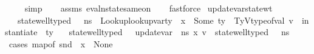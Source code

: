 \begin{isabellebody}
\ \ \ \isamarkupfalse%
\ simp\isanewline
\ \ \isamarkupfalse%
\ assms{\isacharparenleft}{\kern0pt}{}{\isacharparenright}{\kern0pt}\ eval{\isacharunderscore}{\kern0pt}nstate{\isacharunderscore}{\kern0pt}same{\isacharunderscore}{\kern0pt}on{\isacharparenleft}{\kern0pt}{}{\isacharparenright}{\kern0pt}\isanewline
\ \ \isamarkupfalse%
\ fastforce%
\endisatagproof
{\isafoldproof}%
%
\isadelimproof
\isanewline
%
\endisadelimproof
\isanewline
{}\isamarkupfalse%
%
\isadelimdocument
%
\endisadelimdocument
%
\isatagdocument
%
\isamarkuptrue%
%
\endisatagdocument
{\isafolddocument}%
%
\isadelimdocument
%
\endisadelimdocument
{}\isamarkupfalse%
\ update{\isacharunderscore}{\kern0pt}var{\isacharunderscore}{\kern0pt}state{\isacharunderscore}{\kern0pt}wt{\isacharcolon}{\kern0pt}\isanewline
\ \ \ {\isachardoublequoteopen}state{\isacharunderscore}{\kern0pt}well{\isacharunderscore}{\kern0pt}typed\ {\isasymLambda}\ {\isasymOmega}\ ns{\isachardoublequoteclose}\ \ Lookup{\isacharcolon}{\kern0pt}{\isachardoublequoteopen}lookup{\isacharunderscore}{\kern0pt}var{\isacharunderscore}{\kern0pt}ty\ {\isasymLambda}\ x\ {\isacharequal}{\kern0pt}\ Some\ ty{\isachardoublequoteclose}\ \ TyV{\isacharcolon}{\kern0pt}{\isachardoublequoteopen}type{\isacharunderscore}{\kern0pt}of{\isacharunderscore}{\kern0pt}val\ v\ {\isacharequal}{\kern0pt}\ instantiate\ {\isasymOmega}\ ty{\isachardoublequoteclose}\isanewline
\ \ \ {\isachardoublequoteopen}state{\isacharunderscore}{\kern0pt}well{\isacharunderscore}{\kern0pt}typed\ {\isasymLambda}\ {\isasymOmega}\ {\isacharparenleft}{\kern0pt}update{\isacharunderscore}{\kern0pt}var\ {\isasymLambda}\ ns\ x\ v{\isacharparenright}{\kern0pt}{\isachardoublequoteclose}\ {\isacharparenleft}{\kern0pt}\ {\isachardoublequoteopen}state{\isacharunderscore}{\kern0pt}well{\isacharunderscore}{\kern0pt}typed\ {\isasymLambda}\ {\isasymOmega}\ {\isacharquery}{\kern0pt}ns{\isacharprime}{\kern0pt}{\isachardoublequoteclose}{\isacharparenright}{\kern0pt}\isanewline
%
\isadelimproof
\ \ %
\endisadelimproof
%
\isatagproof
{}\isamarkupfalse%
\ {\isacharparenleft}{\kern0pt}cases\ {\isachardoublequoteopen}map{\isacharunderscore}{\kern0pt}of\ {\isacharparenleft}{\kern0pt}snd\ {\isasymLambda}{\isacharparenright}{\kern0pt}\ x\ {\isacharequal}{\kern0pt}\ None{\isachardoublequoteclose}{\isacharparenright}{\kern0pt}\isanewline

\end{isabellebody}
